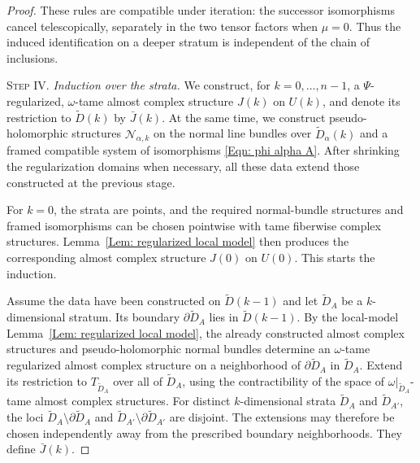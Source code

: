 \documentclass[11pt]{amsart}
\numberwithin{equation}{section}
\theoremstyle{plain}
\theoremstyle{definition}
\newcommand{\scrN}{\mathscr{N}}
\begin{document}
\begin{proof}
These rules are compatible under iteration: the successor isomorphisms
cancel telescopically, separately in the two tensor factors when $\mu=0$.
Thus the induced identification on a deeper stratum is independent of the
chain of inclusions.

\medskip
\noindent\textsc{Step IV}. \emph{Induction over the strata.}
We construct, for $k=0,\ldots,n-1$, a $\Psi$-regularized,
$\omega$-tame almost complex structure $J(k)$ on $U(k)$, and denote its
restriction to $\widetilde D(k)$ by $\bar J(k)$. At the same time, we
construct pseudo-holomorphic structures $\scrN_{\alpha,k}$ on the normal
line bundles over $\widetilde D_\alpha(k)$ and a framed compatible system of 
isomorphisms \eqref{Eqn: phi alpha A}. After shrinking the regularization
domains when necessary, all these data extend those constructed at the
previous stage.

For $k=0$, the strata are points, and the required normal-bundle
structures and framed isomorphisms can be chosen pointwise with tame
fiberwise complex structures. Lemma~\ref{Lem: regularized local model}
then produces the corresponding almost complex structure $J(0)$ on
$U(0)$. This starts the induction.

Assume the data have been constructed on $\widetilde D(k-1)$ and let $\widetilde
D_A$ be a $k$-dimensional stratum. Its boundary $\partial\widetilde D_A$ lies in
$\widetilde D(k-1)$. By the local-model Lemma~\ref{Lem: regularized local
model}, the already constructed almost complex structures and pseudo-holomorphic
normal bundles determine an $\omega$-tame regularized almost complex structure
on a neighborhood of $\partial\widetilde D_A$ in $\widetilde D_A$. Extend its
restriction to $T_{\widetilde D_A}$ over all of $\widetilde D_A$, using the
contractibility of the space of $\omega|_{\widetilde D_A}$-tame almost complex
structures. For distinct $k$-dimensional strata $\widetilde D_A$ and $\widetilde
D_{A'}$, the loci $\widetilde D_A\setminus\partial\widetilde D_A$ and
$\widetilde D_{A'}\setminus\partial\widetilde D_{A'}$ are disjoint. The
extensions may therefore be chosen independently away from the prescribed
boundary neighborhoods. They define $\bar J(k)$.


\end{proof}
\end{document}
